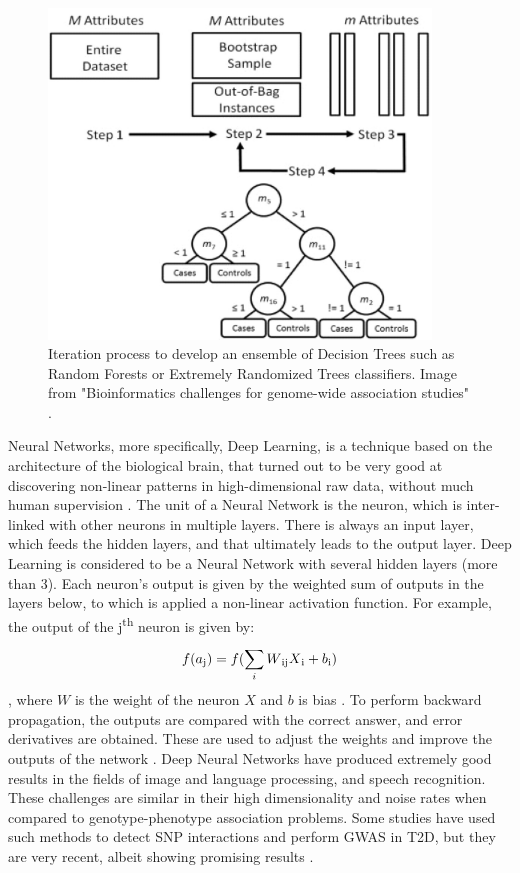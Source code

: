 \begin{figure}[h]
	\centering
	\includegraphics[width=4in]{../images/sota/btp713f1.jpeg}
	\caption{Iteration process to develop an ensemble of Decision Trees such as Random Forests or Extremely Randomized Trees classifiers. Image from "Bioinformatics challenges for genome-wide association studies" \cite{moore2010bioinformatics}.} 
	\label{fig:rf_flow}
\end{figure}

Neural Networks, more specifically, Deep Learning, is a technique based on the architecture of the biological brain, that turned out to be very good at discovering non-linear patterns in high-dimensional raw data, without much human supervision \cite{mamoshina2016applications}. The unit of a Neural Network is the neuron, which is inter-linked with other neurons in multiple layers. There is always an input layer, which feeds the hidden layers, and that ultimately leads to the output layer. Deep Learning is considered to be a Neural Network with several hidden layers (more than 3). Each neuron's output is given by the weighted sum of outputs in the layers below, to which is applied a non-linear activation function. For example, the output of the j\textsuperscript{th} neuron is given by: 
\begin{equation}
f(a\textsubscript{j}) = f(\sum_{i}^{}W\textsubscript{ij}X\textsubscript{i} + b\textsubscript{i})
\end{equation}
, where $W$ is the weight of the neuron $X$ and $b$ is bias \cite{lecun2015deep}. To perform backward propagation, the outputs are compared with the correct answer, and error derivatives are obtained. These are used to adjust the weights and improve the outputs of the network \cite{lecun2015deep, uppu2016towards}. Deep Neural Networks have produced extremely good results in the fields of image and language processing, and speech recognition. These challenges are similar in their high dimensionality and noise rates when compared to  genotype-phenotype association problems. Some studies have used such methods to detect \gls{SNP} interactions and perform \gls{GWAS} in \gls{T2D}, but they are very recent, albeit showing promising results \cite{uppu2016deep, fergus2018utilising, kim2017genetic}.

